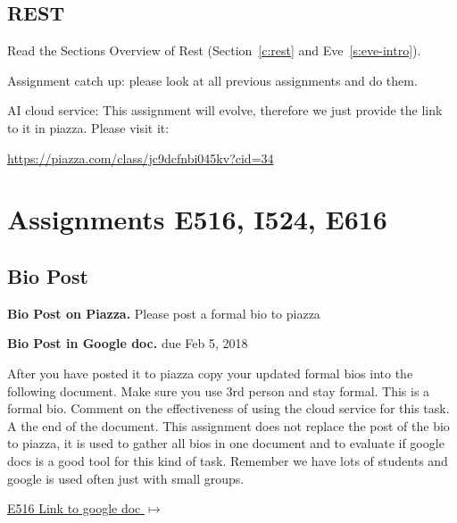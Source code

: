 \subsection{REST}
\begin{exercise}
Read the Sections Overview of Rest (Section~\ref{c:rest} and Eve~\ref{s:eve-intro}).
\end{exercise}

\begin{exercise}
Assignment catch up: please look at all previous assignments and do
them. 
\end{exercise}

\begin{exercise}

AI cloud service: This assignment will evolve, therefore we just
provide the link to it in piazza. Please visit it:

\url{https://piazza.com/class/jc9dcfnbi045kv?cid=34}
\end{exercise}

\section{Assignments E516, I524, E616}
\label{s:616-assignments}

\subsection{Bio Post}\label{a:616-bio}

\begin{exercise}\label{E:616-bio-piazza}
{\bf Bio Post on Piazza.} Please post a formal bio to piazza
\end{exercise}

\begin{exercise}\label{E:616-bio-googledocs}

  {\bf Bio Post in Google doc.} due Feb 5, 2018
  
  After you have posted it to piazza
  copy your updated formal bios into the following document.  Make
  sure you use 3rd person and stay formal. This is a formal
  bio. Comment on the effectiveness of using the cloud service for
  this task. A the end of the document. This assignment does not
  replace the post of the bio to piazza, it is used to gather all bios
  in one document and to evaluate if google docs is a good tool for
  this kind of task. Remember we have lots of students and google is
  used often just with small groups.
 
 \smallskip

 {\hfill
   \href{https://docs.google.com/document/d/1ejzlKYqC3dLac8WXVpcPQsJh1j4BDqRxxgGg1cFQbeQ/edit?usp=sharing}{E516
     Link to google doc $\mapsto$}}


 \end{exercise}

